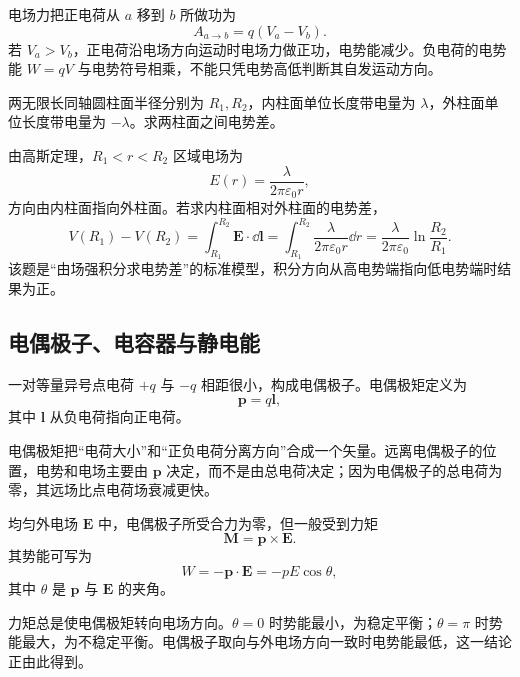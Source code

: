 \begin{pitfall}[电势、电势能和电场力做功的符号]
电场力把正电荷从 $a$ 移到 $b$ 所做功为
\[
  A_{a\to b}=q(V_a-V_b).
\]
若 $V_a>V_b$，正电荷沿电场方向运动时电场力做正功，电势能减少。负电荷的电势能 $W=qV$ 与电势符号相乘，不能只凭电势高低判断其自发运动方向。
\end{pitfall}

\begin{example}[title={同轴圆柱面之间的电势差}]\label{eg:coaxial-potential-difference}
两无限长同轴圆柱面半径分别为 $R_1,R_2$，内柱面单位长度带电量为 $\lambda$，外柱面单位长度带电量为 $-\lambda$。求两柱面之间电势差。
\begin{solution}
由高斯定理，$R_1<r<R_2$ 区域电场为
\[
  E(r)=\frac{\lambda}{2\pi\varepsilon_0 r},
\]
方向由内柱面指向外柱面。若求内柱面相对外柱面的电势差，
\[
  V(R_1)-V(R_2)=\int_{R_1}^{R_2}\bm E\cdot\dd\bm l
  =\int_{R_1}^{R_2}\frac{\lambda}{2\pi\varepsilon_0 r}\dd r
  =\frac{\lambda}{2\pi\varepsilon_0}\ln\frac{R_2}{R_1}.
\]
该题是“由场强积分求电势差”的标准模型，积分方向从高电势端指向低电势端时结果为正。
\end{solution}
\end{example}

\subsection{电偶极子、电容器与静电能}

\begin{definition}[电偶极矩]\label{def:electric-dipole}
一对等量异号点电荷 $+q$ 与 $-q$ 相距很小，构成电偶极子。电偶极矩定义为
\[
  \bm p=q\bm l,
\]
其中 $\bm l$ 从负电荷指向正电荷。
\end{definition}

电偶极矩把“电荷大小”和“正负电荷分离方向”合成一个矢量。远离电偶极子的位置，电势和电场主要由 $\bm p$ 决定，而不是由总电荷决定；因为电偶极子的总电荷为零，其远场比点电荷场衰减更快。

\begin{theorem}[电偶极子在均匀电场中的力矩和势能]\label{thm:dipole-torque}
均匀外电场 $\bm E$ 中，电偶极子所受合力为零，但一般受到力矩
\[
  \bm M=\bm p\times\bm E.
\]
其势能可写为
\[
  W=-\bm p\cdot\bm E=-pE\cos\theta,
\]
其中 $\theta$ 是 $\bm p$ 与 $\bm E$ 的夹角。
\end{theorem}

力矩总是使电偶极矩转向电场方向。$\theta=0$ 时势能最小，为稳定平衡；$\theta=\pi$ 时势能最大，为不稳定平衡。电偶极子取向与外电场方向一致时电势能最低，这一结论正由此得到。

